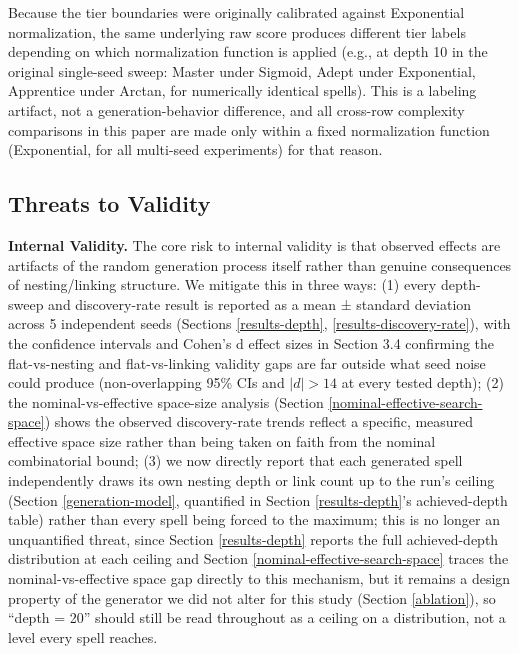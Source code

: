 \documentclass[]{article}
\begin{document}
        Because the tier boundaries were originally calibrated against Exponential normalization, the same underlying raw score produces different tier labels depending on which normalization function is applied (e.g., at depth 10 in the original single-seed sweep: Master under Sigmoid, Adept under Exponential, Apprentice under Arctan, for numerically identical spells). This is a labeling artifact, not a generation-behavior difference, and all cross-row complexity comparisons in this paper are made only within a fixed normalization function (Exponential, for all multi-seed experiments) for that reason.

        \subsection{Threats to Validity}\label{validity-threats}

        \textbf{Internal Validity.} The core risk to internal validity is that observed effects are artifacts of the random generation process itself rather than genuine consequences of nesting/linking structure. We mitigate this in three ways: (1) every depth-sweep and discovery-rate result is reported as a mean ± standard deviation across 5 independent seeds (Sections \ref{results-depth}, \ref{results-discovery-rate}), with the confidence intervals and Cohen's d effect sizes in Section 3.4 confirming the flat-vs-nesting and flat-vs-linking validity gaps are far outside what seed noise could produce (non-overlapping 95\% CIs and $|d| > 14$ at every tested depth); (2) the nominal-vs-effective space-size analysis (Section \ref{nominal-effective-search-space}) shows the observed discovery-rate trends reflect a specific, measured effective space size rather than being taken on faith from the nominal combinatorial bound; (3) we now directly report that each generated spell independently draws its own nesting depth or link count up to the run's ceiling (Section \ref{generation-model}, quantified in Section \ref{results-depth}'s achieved-depth table) rather than every spell being forced to the maximum; this is no longer an unquantified threat, since Section \ref{results-depth} reports the full achieved-depth distribution at each ceiling and Section \ref{nominal-effective-search-space} traces the nominal-vs-effective space gap directly to this mechanism, but it remains a design property of the generator we did not alter for this study (Section \ref{ablation}), so ``depth = 20'' should still be read throughout as a ceiling on a distribution, not a level every spell reaches.
\end{document}
